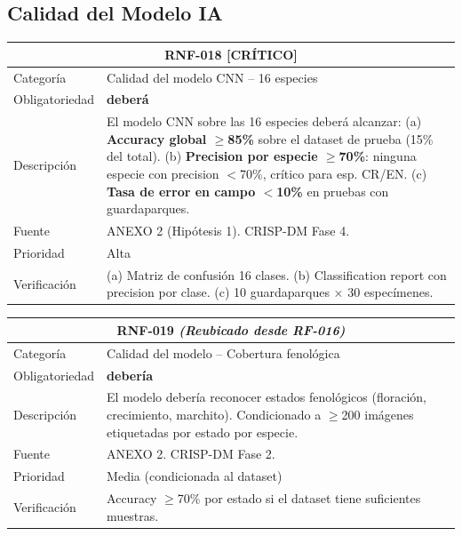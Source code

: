 \documentclass[12pt, a4paper]{article}
\newcommand{\criticomark}{\textcolor{criticolor}{\textbf{[CR\'ITICO]}}}
\begin{document}
\subsection{Calidad del Modelo IA}

\begin{longtable}{|p{3cm}|p{11.5cm}|}
\hline
\multicolumn{2}{|c|}{\textbf{RNF-018} \criticomark} \\
\hline
Categor\'ia & Calidad del modelo CNN -- 16 especies \\
\hline
Obligatoriedad & \textbf{deber\'a} \\
\hline
Descripci\'on & El modelo CNN sobre las 16 especies deber\'a alcanzar:\newline
(a) \textbf{Accuracy global $\geq$85\%} sobre el dataset de prueba (15\% del total).\newline
(b) \textbf{Precision por especie $\geq$70\%}: ninguna especie con precision $<$70\%, cr\'itico para esp. CR/EN.\newline
(c) \textbf{Tasa de error en campo $<$10\%} en pruebas con guardaparques. \\
\hline
Fuente & ANEXO 2 (Hip\'otesis 1). CRISP-DM Fase 4. \\
\hline
Prioridad & Alta \\
\hline
Verificaci\'on & (a) Matriz de confusi\'on 16 clases. (b) Classification report con precision por clase. (c) 10 guardaparques $\times$ 30 espec\'imenes. \\
\hline
\end{longtable}

\begin{longtable}{|p{3cm}|p{11.5cm}|}
\hline
\multicolumn{2}{|c|}{\textbf{RNF-019} \textit{(Reubicado desde RF-016)}} \\
\hline
Categor\'ia & Calidad del modelo -- Cobertura fenol\'ogica \\
\hline
Obligatoriedad & \textbf{deber\'ia} \\
\hline
Descripci\'on & El modelo deber\'ia reconocer estados fenol\'ogicos (floraci\'on, crecimiento, marchito). Condicionado a $\geq$200 im\'agenes etiquetadas por estado por especie. \\
\hline
Fuente & ANEXO 2. CRISP-DM Fase 2. \\
\hline
Prioridad & Media (condicionada al dataset) \\
\hline
Verificaci\'on & Accuracy $\geq$70\% por estado si el dataset tiene suficientes muestras. \\
\hline
\end{longtable}
\end{document}
